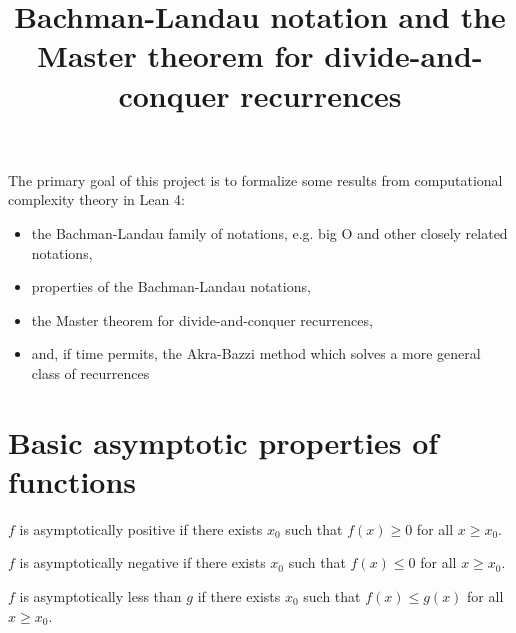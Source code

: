 %

\title{Bachman-Landau notation and the Master theorem for divide-and-conquer recurrences}

The primary goal of this project is to formalize some results from computational 
complexity theory in Lean 4:
\begin{itemize}
\item the Bachman-Landau family of notations, e.g. big O and other closely related notations,
\item properties of the Bachman-Landau notations,
\item the Master theorem for divide-and-conquer recurrences,
\item and, if time permits, the Akra-Bazzi method which solves a more general class of recurrences
\end{itemize}


\section{Basic asymptotic properties of functions}

\begin{definition}
    \label{def:asymp_pos}
    \leanok
    $f$ is asymptotically positive if there exists $x_0$ such that $f(x) \ge 0$
    for all $x \ge x_0$.

\end{definition}

\begin{definition}
    \label{def:asymp_neg}
    \leanok
    $f$ is asymptotically negative if there exists $x_0$ such that $f(x) \le 0$
    for all $x \ge x_0$.

\end{definition}

\begin{definition}
    \label{def:asymp_le}
    \leanok
    $f$ is asymptotically less than $g$ if there exists $x_0$ such that
    $f(x) \le g(x)$ for all $x \ge x_0$.

\end{definition}

